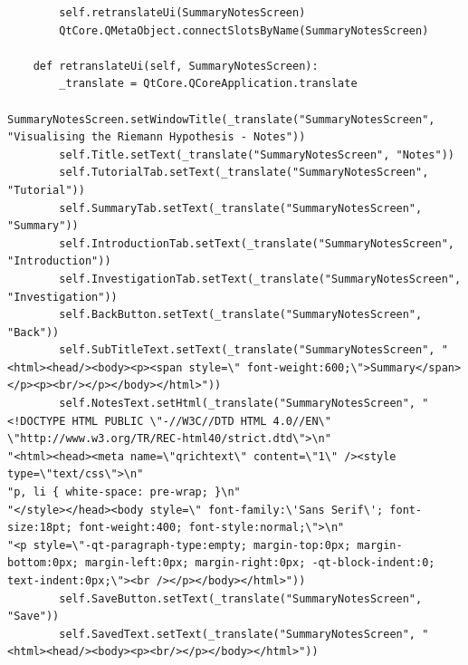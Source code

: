 \documentclass[12pt]{article}
\begin{document}
\begin{lstlisting}
        self.retranslateUi(SummaryNotesScreen)
        QtCore.QMetaObject.connectSlotsByName(SummaryNotesScreen)

    def retranslateUi(self, SummaryNotesScreen):
        _translate = QtCore.QCoreApplication.translate
        SummaryNotesScreen.setWindowTitle(_translate("SummaryNotesScreen", "Visualising the Riemann Hypothesis - Notes"))
        self.Title.setText(_translate("SummaryNotesScreen", "Notes"))
        self.TutorialTab.setText(_translate("SummaryNotesScreen", "Tutorial"))
        self.SummaryTab.setText(_translate("SummaryNotesScreen", "Summary"))
        self.IntroductionTab.setText(_translate("SummaryNotesScreen", "Introduction"))
        self.InvestigationTab.setText(_translate("SummaryNotesScreen", "Investigation"))
        self.BackButton.setText(_translate("SummaryNotesScreen", "Back"))
        self.SubTitleText.setText(_translate("SummaryNotesScreen", "<html><head/><body><p><span style=\" font-weight:600;\">Summary</span></p><p><br/></p></body></html>"))
        self.NotesText.setHtml(_translate("SummaryNotesScreen", "<!DOCTYPE HTML PUBLIC \"-//W3C//DTD HTML 4.0//EN\" \"http://www.w3.org/TR/REC-html40/strict.dtd\">\n"
"<html><head><meta name=\"qrichtext\" content=\"1\" /><style type=\"text/css\">\n"
"p, li { white-space: pre-wrap; }\n"
"</style></head><body style=\" font-family:\'Sans Serif\'; font-size:18pt; font-weight:400; font-style:normal;\">\n"
"<p style=\"-qt-paragraph-type:empty; margin-top:0px; margin-bottom:0px; margin-left:0px; margin-right:0px; -qt-block-indent:0; text-indent:0px;\"><br /></p></body></html>"))
        self.SaveButton.setText(_translate("SummaryNotesScreen", "Save"))
        self.SavedText.setText(_translate("SummaryNotesScreen", "<html><head/><body><p><br/></p></body></html>"))
\end{lstlisting}
\end{document}

